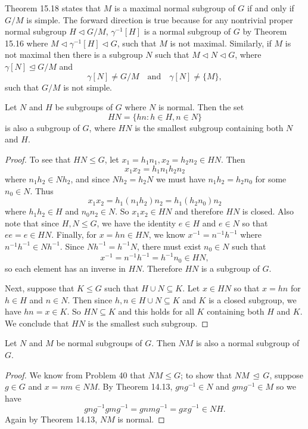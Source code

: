 \documentclass{article}
\newenvironment{problem1}[1]{\noindent {\bf Problem #1:}}
{\medskip}
\begin{document}
\begin{problem1}{33} Theorem 15.18 states that $M$ is a maximal normal subgroup of $G$ if and only if $G/M$ is simple. The forward direction is true because for any nontrivial proper normal subgroup $H \lhd G/M$, $\gamma^{-1}[H]$ is a normal subgroup of $G$ by Theorem 15.16 where $M \lhd \gamma^{-1}[H] \lhd G$, such that $M$ is not maximal. Similarly, if $M$ is not maximal then there is a subgroup $N$ such that $M \lhd N \lhd G$, where $\gamma[N] \unlhd G/M$ and $$\gamma[N]\ne G/M\quad \text{and}\quad\gamma[N]\ne \{M\},$$ such that $G/M$ is not simple.

\end{problem1}


\begin{problem1}{40} Let $N$ and $H$ be subgroups of $G$ where $N$ is normal. Then the set $$HN=\{hn : h\in H, n\in N\}$$ is also a subgroup of $G$, where $HN$ is the smallest subgroup containing both $N$ and $H$.
\begin{proof} To see that $HN\le G$, let $x_1=h_1n_1, x_2=h_2n_2 \in HN$. Then $$x_1x_2=h_1n_1h_2n_2$$ where $n_1h_2 \in Nh_2$, and since $Nh_2=h_2N$ we must have $n_1h_2=h_2n_0$ for some $n_0\in N$. Thus $$x_1x_2=h_1(n_1h_2)n_2=h_1(h_2n_0)n_2$$ where $h_1h_2\in H$ and $n_0n_2\in N$. So $x_1x_2\in HN$ and therefore $HN$ is closed. Also note that since $H,N\le G$, we have the identity $e\in H$ and $e\in N$ so that $ee=e\in HN.$ Finally, for $x=hn\in HN$, we know $x^{-1}=n^{-1}h^{-1}$ where $n^{-1}h^{-1}\in Nh^{-1}$. Since $Nh^{-1}=h^{-1}N$, there must exist $n_0\in N$ such that $$x^{-1}=n^{-1}h^{-1}=h^{-1}n_0\in HN,$$ so each element has an inverse in $HN$. Therefore $HN$ is a subgroup of $G$.

Next, suppose that $K\le G$ such that $H\cup N\subseteq K$. Let $x\in HN$ so that $x=hn$ for $h\in H$ and $n\in N$. Then since $h,n\in H\cup N \subseteq K$ and $K$ is a closed subgroup, we have $hn=x\in K$. So $HN \subseteq K$ and this holds for all $K$ containing both $H$ and $K$. We conclude that $HN$ is the smallest such subgroup.
\end{proof}\end{problem1}


\begin{problem1}{41} Let $N$ and $M$ be normal subgroups of $G$. Then $NM$ is also a normal subgroup of $G$.
\begin{proof} We know from Problem 40 that $NM\le G$; to show that $NM\,\unlhd \,G$, suppose $g\in G$ and $x=nm\in NM.$ By Theorem 14.13, $gng^{-1}\in N$ and $gmg^{-1}\in M$ so we have $$gng^{-1}gmg^{-1}=gnmg^{-1}=gxg^{-1}\in NH.$$ Again by Theorem 14.13, $NM$ is normal.

\end{proof}

\end{problem1}
\end{document}
